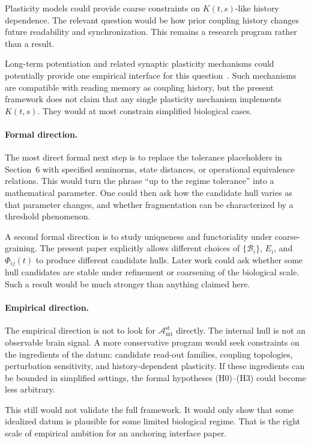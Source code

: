 \documentclass[12pt]{article}
\theoremstyle{definition}
\theoremstyle{remark}
\newcommand{\Bint}{\mathcal A_{\mathrm{int}}^{\mathrm{st}}}
\begin{document}
Plasticity models could provide coarse constraints on \(K(t,s)\)-like
history dependence. The relevant question would be how prior coupling
history changes future readability and synchronization. This remains a
research program rather than a result.

Long-term potentiation and related synaptic plasticity mechanisms could
potentially provide one empirical interface for this question~\cite{BlissLomo1973,BlissCollingridge1993}.
Such mechanisms are
compatible with reading memory as coupling history, but the present
framework does not claim that any single plasticity mechanism implements
\(K(t,s)\). They would at most constrain simplified biological cases.

\paragraph{Formal direction.}
The most direct formal next step is to replace the tolerance placeholders
in Section~6 with specified seminorms, state distances, or operational
equivalence relations. This would turn the phrase ``up to the regime
tolerance'' into a mathematical parameter. One could then ask how the
candidate hull varies as that parameter changes, and whether
fragmentation can be characterized by a threshold phenomenon.

A second formal direction is to study uniqueness and functoriality under
coarse-graining. The present paper explicitly allows different choices
of \(\{\mathcal B_i\}\), \(E_i\), and \(\Phi_{ij}(t)\) to produce
different candidate hulls. Later work could ask whether some hull
candidates are stable under refinement or coarsening of the biological
scale. Such a result would be much stronger than anything claimed here.

\paragraph{Empirical direction.}
The empirical direction is not to look for \(\Bint\) directly. The
internal hull is not an observable brain signal. A more conservative
program would seek constraints on the ingredients of the datum:
candidate read-out families, coupling topologies, perturbation
sensitivity, and history-dependent plasticity. If these ingredients can
be bounded in simplified settings, the formal hypotheses (H0)--(H3)
could become less arbitrary.

This still would not validate the full framework. It would only show
that some idealized datum is plausible for some limited biological
regime. That is the right scale of empirical ambition for an anchoring
interface paper.
\end{document}
